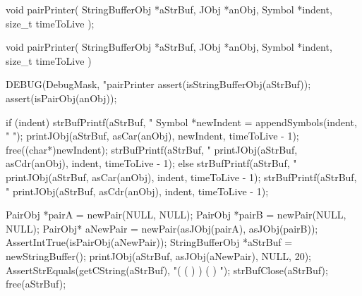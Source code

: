 \startTestSuite[pairPrinter]

\startCHeader
void pairPrinter(
  StringBufferObj *aStrBuf,
  JObj            *anObj,
  Symbol          *indent,
  size_t          timeToLive
);
\stopCHeader

\startCCode
void pairPrinter(
  StringBufferObj *aStrBuf,
  JObj            *anObj,
  Symbol          *indent,
  size_t           timeToLive
) {
  DEBUG(DebugMask, "pairPrinter %
  assert(isStringBufferObj(aStrBuf));
  assert(isPairObj(anObj));
  
  if (indent) {
    strBufPrintf(aStrBuf, "%
    Symbol *newIndent = appendSymbols(indent, "  ");
    printJObj(aStrBuf, asCar(anObj), newIndent, timeToLive - 1);
    free((char*)newIndent);
    strBufPrintf(aStrBuf, "%
    printJObj(aStrBuf, asCdr(anObj), indent, timeToLive - 1);
  } else {
    strBufPrintf(aStrBuf, "%
    printJObj(aStrBuf, asCar(anObj), indent, timeToLive - 1);
    strBufPrintf(aStrBuf, "%
    printJObj(aStrBuf, asCdr(anObj), indent, timeToLive - 1);
  }
  
}
\stopCCode


\startCTest
  PairObj *pairA = newPair(NULL, NULL);
  PairObj *pairB = newPair(NULL, NULL);
  PairObj* aNewPair = newPair(asJObj(pairA), asJObj(pairB));
  AssertIntTrue(isPairObj(aNewPair));
  StringBufferObj *aStrBuf = newStringBuffer();
  printJObj(aStrBuf, asJObj(aNewPair), NULL, 20);
  AssertStrEquals(getCString(aStrBuf), "( (  )  ) (  )  ");
  strBufClose(aStrBuf);
  free(aStrBuf);
\stopCTest
\stopTestCase
\stopTestSuite

